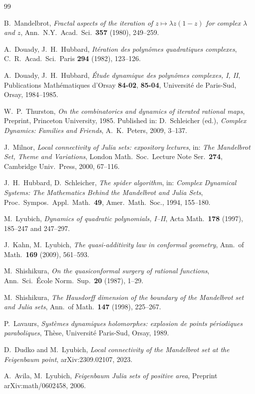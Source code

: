 \documentclass[12pt,a4paper]{amsart}
\theoremstyle{definition}
\theoremstyle{remark}
\begin{document}
\begin{thebibliography}{99}

B.~Mandelbrot,
\textit{Fractal aspects of the iteration of $z \mapsto \lambda z(1-z)$ for
complex $\lambda$ and $z$},
Ann.\ N.Y.\ Acad.\ Sci.\ \textbf{357} (1980), 249--259.

A.~Douady, J.~H.~Hubbard,
\textit{Itération des polynômes quadratiques complexes},
C.\ R.\ Acad.\ Sci.\ Paris \textbf{294} (1982), 123--126.

A.~Douady, J.~H.~Hubbard,
\textit{Étude dynamique des polynômes complexes, I, II},
Publications Mathématiques d'Orsay \textbf{84-02}, \textbf{85-04},
Université de Paris-Sud, Orsay, 1984--1985.

W.~P.~Thurston,
\textit{On the combinatorics and dynamics of iterated rational maps},
Preprint, Princeton University, 1985. Published in: D.~Schleicher (ed.),
\textit{Complex Dynamics: Families and Friends}, A.~K.~Peters, 2009, 3--137.

J.~Milnor,
\textit{Local connectivity of Julia sets: expository lectures},
in: \textit{The Mandelbrot Set, Theme and Variations},
London Math.\ Soc.\ Lecture Note Ser.\ \textbf{274},
Cambridge Univ.\ Press, 2000, 67--116.

J.~H.~Hubbard, D.~Schleicher,
\textit{The spider algorithm},
in: \textit{Complex Dynamical Systems: The Mathematics Behind the
Mandelbrot and Julia Sets}, Proc.\ Sympos.\ Appl.\ Math.\ \textbf{49},
Amer.\ Math.\ Soc., 1994, 155--180.

M.~Lyubich,
\textit{Dynamics of quadratic polynomials, I–II},
Acta Math.\ \textbf{178} (1997), 185--247 and 247--297.

J.~Kahn, M.~Lyubich,
\textit{The quasi-additivity law in conformal geometry},
Ann.\ of Math.\ \textbf{169} (2009), 561--593.

M.~Shishikura,
\textit{On the quasiconformal surgery of rational functions},
Ann.\ Sci.\ École Norm.\ Sup.\ \textbf{20} (1987), 1--29.

M.~Shishikura,
\textit{The Hausdorff dimension of the boundary of the Mandelbrot set
and Julia sets},
Ann.\ of Math.\ \textbf{147} (1998), 225--267.

P.~Lavaurs,
\textit{Systèmes dynamiques holomorphes: explosion de points périodiques
paraboliques},
Thèse, Université Paris-Sud, Orsay, 1989.

D.~Dudko and M.~Lyubich,
\textit{Local connectivity of the Mandelbrot set at the Feigenbaum point},
arXiv:2309.02107, 2023.

A.~Avila, M.~Lyubich,
\textit{Feigenbaum Julia sets of positive area},
Preprint arXiv:math/0602458, 2006.

\end{thebibliography}
\end{document}
